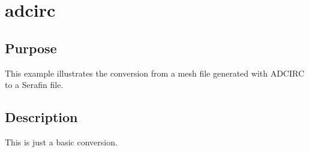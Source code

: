 \chapter{adcirc}
%
%
\section{Purpose}
This example illustrates the conversion from a mesh file generated with
ADCIRC to a Serafin file.
%
\section{Description}
This is just a basic conversion.
%
%
%
%
%
%
%
%

%
